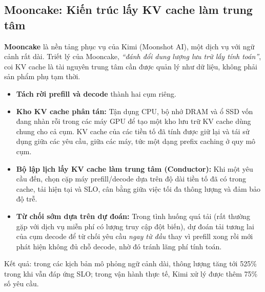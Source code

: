 \subsection{Mooncake: Kiến trúc lấy KV cache làm trung tâm}
\label{ssec:mooncake}
\textbf{Mooncake} \cite{qin2024mooncake} là nền tảng phục vụ của Kimi (Moonshot AI), một dịch vụ với ngữ cảnh rất dài. Triết lý của Mooncake, \emph{“đánh đổi dung lượng lưu trữ lấy tính toán”}, coi KV cache là tài nguyên trung tâm cần được quản lý như dữ liệu, không phải sản phẩm phụ tạm thời.
\begin{itemize}
	\item \textbf{Tách rời prefill và decode} thành hai cụm riêng.
	\item \textbf{Kho KV cache phân tán:} Tận dụng CPU, bộ nhớ DRAM và ổ SSD vốn đang nhàn rỗi trong các máy GPU để tạo một kho lưu trữ KV cache dùng chung cho cả cụm. KV cache của các tiền tố đã tính được giữ lại và tái sử dụng giữa các yêu cầu, giữa các máy, tức một dạng prefix caching ở quy mô cụm.
	\item \textbf{Bộ lập lịch lấy KV cache làm trung tâm (Conductor):} Khi một yêu cầu đến, chọn cặp máy prefill/decode dựa trên độ dài tiền tố đã có trong cache, tải hiện tại và SLO, cân bằng giữa việc tối đa thông lượng và đảm bảo độ trễ.
	\item \textbf{Từ chối sớm dựa trên dự đoán:} Trong tình huống quá tải (rất thường gặp với dịch vụ miễn phí có lượng truy cập đột biến), dự đoán tải tương lai của cụm decode để từ chối yêu cầu \emph{ngay từ đầu} thay vì prefill xong rồi mới phát hiện không đủ chỗ decode, nhờ đó tránh lãng phí tính toán.
\end{itemize}
Kết quả: trong các kịch bản mô phỏng ngữ cảnh dài, thông lượng tăng tới 525\% trong khi vẫn đáp ứng SLO; trong vận hành thực tế, Kimi xử lý được thêm 75\% số yêu cầu.

\begin{center}
\label{fig:mooncake}
\end{center}


